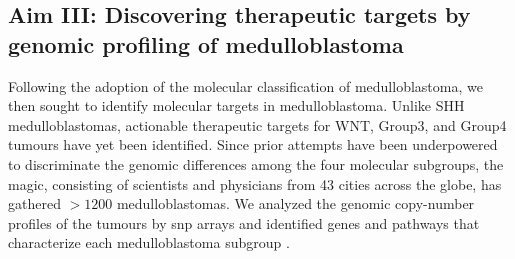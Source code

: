 \subsection*{Aim III: Discovering therapeutic targets by genomic profiling of medulloblastoma}

Following the adoption of the molecular classification of medulloblastoma, we then sought to identify molecular targets in medulloblastoma. Unlike SHH medulloblastomas, actionable therapeutic targets for WNT, Group3, and Group4 tumours have yet been identified. Since prior attempts have been underpowered to discriminate the genomic differences among the four molecular subgroups, the \gls{magic}, consisting of scientists and physicians from 43 cities across the globe, has gathered $>1200$ medulloblastomas. We analyzed the genomic copy-number profiles of the tumours by \gls{snp} arrays and identified genes and pathways that characterize each medulloblastoma subgroup .

